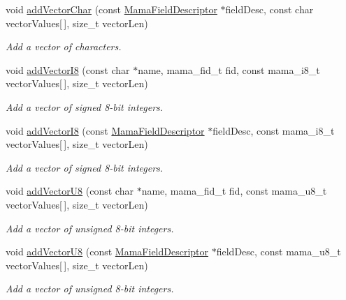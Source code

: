 \begin{DoxyCompactItemize}
void \hyperlink{classWombat_1_1MamaMsg_aca6dadc3a488025091d7569355dd55b1}{addVectorChar} (const \hyperlink{classWombat_1_1MamaFieldDescriptor}{MamaFieldDescriptor} $\ast$fieldDesc, const char vectorValues\mbox{[}$\,$\mbox{]}, size\_\-t vectorLen)
\begin{DoxyCompactList}\small\item\em Add a vector of characters. \item\end{DoxyCompactList}\item 
void \hyperlink{classWombat_1_1MamaMsg_ab54e7454c9788dec664ee689d166e234}{addVectorI8} (const char $\ast$name, mama\_\-fid\_\-t fid, const mama\_\-i8\_\-t vectorValues\mbox{[}$\,$\mbox{]}, size\_\-t vectorLen)
\begin{DoxyCompactList}\small\item\em Add a vector of signed 8-\/bit integers. \item\end{DoxyCompactList}\item 
void \hyperlink{classWombat_1_1MamaMsg_a1e3b26329173690051056e764ae932bb}{addVectorI8} (const \hyperlink{classWombat_1_1MamaFieldDescriptor}{MamaFieldDescriptor} $\ast$fieldDesc, const mama\_\-i8\_\-t vectorValues\mbox{[}$\,$\mbox{]}, size\_\-t vectorLen)
\begin{DoxyCompactList}\small\item\em Add a vector of signed 8-\/bit integers. \item\end{DoxyCompactList}\item 
void \hyperlink{classWombat_1_1MamaMsg_acce4beb22b3aa29ad2de80fdd03f9a84}{addVectorU8} (const char $\ast$name, mama\_\-fid\_\-t fid, const mama\_\-u8\_\-t vectorValues\mbox{[}$\,$\mbox{]}, size\_\-t vectorLen)
\begin{DoxyCompactList}\small\item\em Add a vector of unsigned 8-\/bit integers. \item\end{DoxyCompactList}\item 
void \hyperlink{classWombat_1_1MamaMsg_aedd6c686eb74cf01aca0933c9cad9f4f}{addVectorU8} (const \hyperlink{classWombat_1_1MamaFieldDescriptor}{MamaFieldDescriptor} $\ast$fieldDesc, const mama\_\-u8\_\-t vectorValues\mbox{[}$\,$\mbox{]}, size\_\-t vectorLen)
\begin{DoxyCompactList}\small\item\em Add a vector of unsigned 8-\/bit integers. \item\end{DoxyCompactList}\item 

\end{DoxyCompactItemize}
